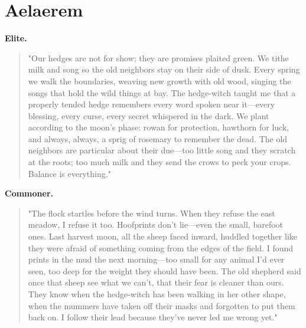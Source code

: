 \section*{Aelaerem}
\textbf{Elite.}
\begin{quote}
"Our hedges are not for show; they are promises plaited green. We tithe milk and song so the old neighbors stay on their side of dusk. Every spring we walk the boundaries, weaving new growth with old wood, singing the songs that hold the wild things at bay. The hedge-witch taught me that a properly tended hedge remembers every word spoken near it—every blessing, every curse, every secret whispered in the dark. We plant according to the moon's phase: rowan for protection, hawthorn for luck, and always, always, a sprig of rosemary to remember the dead. The old neighbors are particular about their due—too little song and they scratch at the roots; too much milk and they send the crows to peck your crops. Balance is everything."
\end{quote}
\textbf{Commoner.}
\begin{quote}
"The flock startles before the wind turns. When they refuse the east meadow, I refuse it too. Hoofprints don't lie—even the small, barefoot ones. Last harvest moon, all the sheep faced inward, huddled together like they were afraid of something coming from the edges of the field. I found prints in the mud the next morning—too small for any animal I'd ever seen, too deep for the weight they should have been. The old shepherd said once that sheep see what we can't, that their fear is cleaner than ours. They know when the hedge-witch has been walking in her other shape, when the mummers have taken off their masks and forgotten to put them back on. I follow their lead because they've never led me wrong yet."
\end{quote}

